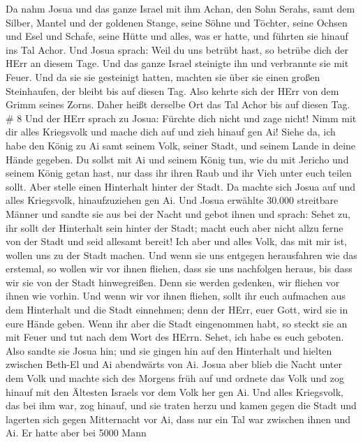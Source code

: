 Da nahm Josua und das ganze Israel mit ihm Achan, den Sohn Serahs, samt
dem Silber, Mantel und der goldenen Stange, seine Söhne und Töchter,
seine Ochsen und Esel und Schafe, seine Hütte und alles, was er hatte,
und führten sie hinauf ins Tal Achor.  Und Josua sprach:
Weil du uns betrübt hast, so betrübe dich der HErr an diesem Tage. Und
das ganze Israel steinigte ihn und verbrannte sie mit Feuer. Und da sie
sie gesteinigt hatten,  machten sie über sie einen großen
Steinhaufen, der bleibt bis auf diesen Tag. Also kehrte sich der HErr
von dem Grimm seines Zorns. Daher heißt derselbe Ort das Tal Achor bis
auf diesen Tag. \# 8  Und der HErr sprach zu Josua: Fürchte
dich nicht und zage nicht! Nimm mit dir alles Kriegsvolk und mache dich
auf und zieh hinauf gen Ai! Siehe da, ich habe den König zu Ai samt
seinem Volk, seiner Stadt, und seinem Lande in deine Hände gegeben.
 Du sollst mit Ai und seinem König tun, wie du mit Jericho
und seinem König getan hast, nur dass ihr ihren Raub und ihr Vieh unter
euch teilen sollt. Aber stelle einen Hinterhalt hinter der Stadt.
 Da machte sich Josua auf und alles Kriegsvolk,
hinaufzuziehen gen Ai. Und Josua erwählte 30.000 streitbare Männer und
sandte sie aus bei der Nacht  und gebot ihnen und sprach:
Sehet zu, ihr sollt der Hinterhalt sein hinter der Stadt; macht euch
aber nicht allzu ferne von der Stadt und seid allesamt bereit!
 Ich aber und alles Volk, das mit mir ist, wollen uns zu der
Stadt machen. Und wenn sie uns entgegen herausfahren wie das erstemal,
so wollen wir vor ihnen fliehen,  dass sie uns nachfolgen
heraus, bis dass wir sie von der Stadt hinwegreißen. Denn sie werden
gedenken, wir fliehen vor ihnen wie vorhin. Und wenn wir vor ihnen
fliehen,  sollt ihr euch aufmachen aus dem Hinterhalt und
die Stadt einnehmen; denn der HErr, euer Gott, wird sie in eure Hände
geben.  Wenn ihr aber die Stadt eingenommen habt, so steckt
sie an mit Feuer und tut nach dem Wort des HErrn. Sehet, ich habe es
euch geboten.  Also sandte sie Josua hin; und sie gingen hin
auf den Hinterhalt und hielten zwischen Beth-El und Ai abendwärts von
Ai. Josua aber blieb die Nacht unter dem Volk  und machte
sich des Morgens früh auf und ordnete das Volk und zog hinauf mit den
Ältesten Israels vor dem Volk her gen Ai.  Und alles
Kriegsvolk, das bei ihm war, zog hinauf, und sie traten herzu und kamen
gegen die Stadt und lagerten sich gegen Mitternacht vor Ai, dass nur ein
Tal war zwischen ihnen und Ai.  Er hatte aber bei 5000 Mann

